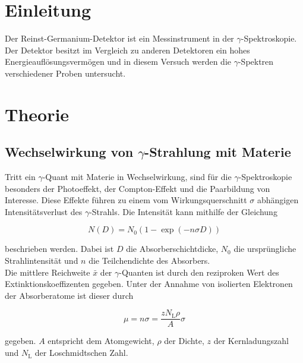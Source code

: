 \section{Einleitung} %
\label{sec:einleitung}

Der Reinst-Germanium-Detektor ist ein Messinstrument in der $\gamma$-Spektroskopie.
Der Detektor besitzt im Vergleich zu anderen Detektoren ein hohes Energieauflösungsvermögen und in diesem Versuch werden die $\gamma$-Spektren verschiedener Proben untersucht.

\section{Theorie} %
\label{sec:theorie}

\subsection{Wechselwirkung von $\gamma$-Strahlung mit Materie} %
\label{sub:wechselwirkung_von_gamma_strahlung_mit_materie}

Tritt ein $\gamma$-Quant mit Materie in Wechselwirkung, sind für die $\gamma$-Spektroskopie besonders der Photoeffekt, der Compton-Effekt und die Paarbildung von Interesse.
Diese Effekte führen zu einem vom Wirkungsquerschnitt $\sigma$ abhängigen Intensitätsverlust des $\gamma$-Strahls.
Die Intensität kann mithilfe der Gleichung

\begin{equation}
	N(D) = N_\text{0} \left(1-\exp\left(- n \sigma D\right)\right)
\end{equation}

beschrieben werden.
Dabei ist $D$ die Absorberschichtdicke, $N_\text{0}$ die ursprüngliche Strahlintensität und $n$ die Teilchendichte des Absorbers.\\

Die mittlere Reichweite $\bar{x}$ der $\gamma$-Quanten ist durch den reziproken Wert des Extinktionskoeffizenten gegeben.
Unter der Annahme von isolierten Elektronen der Absorberatome ist dieser durch

\begin{equation}
	\mu = n \sigma = \frac{z N_\text{L} \rho}{A} \sigma
\end{equation}

gegeben.
$A$ entspricht dem Atomgewicht, $\rho$ der Dichte, $z$ der Kernladungszahl und $N_\text{L}$ der Loschmidtschen Zahl.\\

